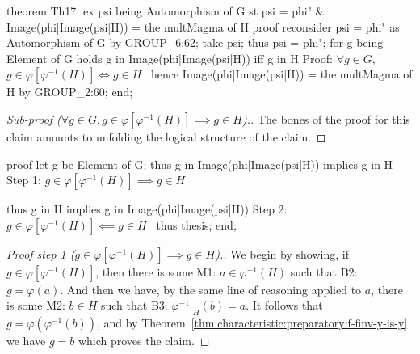 \nwenddocs{}\endmoddef\nwstartdeflinemarkup{}\nwenddeflinemarkup
theorem Th17:
  ex psi being Automorphism of G
  st psi = phi" & Image(phi|Image(psi|H)) = the multMagma of H
proof
  reconsider psi = phi" as Automorphism of G by GROUP_6:62;
  take psi;
  thus psi = phi";
  for g being Element of G holds g in Image(phi|Image(psi|H)) iff g in H
  \LA{}Proof: $\forall g\in G$, $g\in\varphi[\varphi^{-1}(H)]\iff g\in H$~{\nwtagstyle{}}\RA{}
  hence Image(phi|Image(psi|H)) = the multMagma of H by GROUP_2:60;
end;
\eatline
{}\nwendcode{}\nwdocspar
\begin{proof}[{Sub-proof ($\forall g\in G, g\in\varphi[\varphi^{-1}(H)]\implies g\in H$)}.]
The bones of the proof for this claim amounts to unfolding the
logical structure of the claim.
\end{proof}

\nwenddocs{}\endmoddef\nwstartdeflinemarkup{}\nwenddeflinemarkup
proof
  let g be Element of G;
  thus g in Image(phi|Image(psi|H)) implies g in H
  \LA{}Step 1: $g\in\varphi[\varphi^{-1}(H)]\implies g\in H$~{\nwtagstyle{}}\RA{}

  thus g in H implies g in Image(phi|Image(psi|H))
  \LA{}Step 2: $g\in\varphi[\varphi^{-1}(H)]\impliedby g\in H$~{\nwtagstyle{}}\RA{}
  thus thesis;
end;
\nwendcode{}\nwdocspar

\begin{proof}[{Proof step 1 ($g\in\varphi[\varphi^{-1}(H)]\implies g\in H$)}.]
We begin by showing, if $g\in\varphi[\varphi^{-1}(H)]$, then there is
some {\Tt{}M1:\nwendquote} $a\in\varphi^{-1}(H)$ such that {\Tt{}B2:\nwendquote} $g=\varphi(a)$. And
then we have, by the same line of reasoning applied to $a$, there is
some {\Tt{}M2:\nwendquote} $b\in H$ such that {\Tt{}B3:\nwendquote} $\varphi^{-1}|_{H}(b)=a$. It
follows that $g = \varphi(\varphi^{-1}(b))$, and by Theorem~\ref{thm:characteristic:preparatory:f-finv-y-is-y} we have
$g = b$ which proves the claim.
\end{proof}

